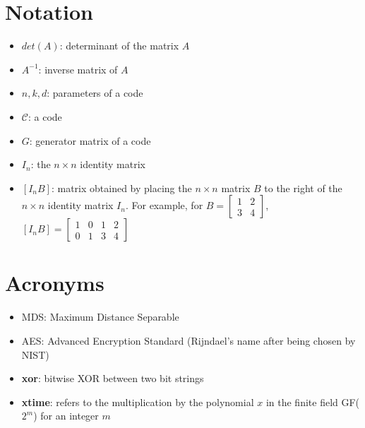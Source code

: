 \documentclass{report}
\begin{document}
\section{Notation}
\begin{itemize}
    \item $det(A)$: determinant of the matrix $A$
    \item $A^{-1}$: inverse matrix of $A$
    \item $n, k, d$: parameters of a code
    \item $\mathcal{C}$: a code
    \item $G$: generator matrix of a code
    \item $I_n$: the $n \times n$ identity matrix
    \item $[I_nB]$: matrix obtained by placing the $n \times n$ matrix $B$ to the right of the $n \times n$ identity matrix $I_n$. For example, for $B = \begin{bmatrix}1 & 2 \\ 3 & 4\end{bmatrix}$, $[I_nB] = \begin{bmatrix} 1 & 0 & 1 & 2 \\ 0 & 1 & 3 & 4\end{bmatrix}$
\end{itemize}

\section{Acronyms}
\begin{itemize}
    \item MDS: Maximum Distance Separable
    \item AES: Advanced Encryption Standard (Rijndael's name after being chosen by NIST)
    \item \textbf{xor}: bitwise XOR between two bit strings
    \item \textbf{xtime}: refers to the multiplication by the polynomial $x$ in the finite field GF($2^m$) for an integer $m$
\end{itemize}
\end{document}
